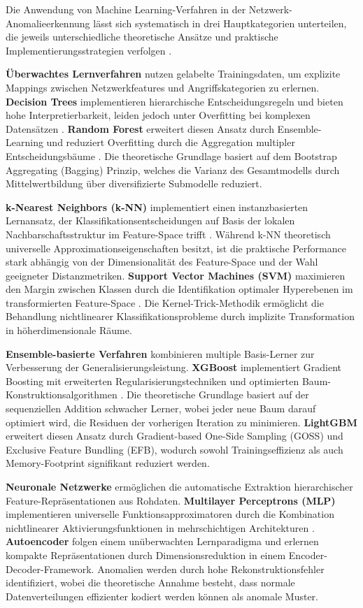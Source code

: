 \documentclass[11pt,a4paper]{article}
\begin{document}
    Die Anwendung von Machine Learning-Verfahren in der Netzwerk-Anomalieerkennung lässt sich systematisch in drei Hauptkategorien unterteilen, die jeweils unterschiedliche theoretische Ansätze und praktische Implementierungsstrategien verfolgen \parencite{Vinayakumar2019}.

    \textbf{Überwachtes Lernverfahren} nutzen gelabelte Trainingsdaten, um explizite Mappings zwischen Netzwerkfeatures und Angriffskategorien zu erlernen. \textbf{Decision Trees} implementieren hierarchische Entscheidungsregeln und bieten hohe Interpretierbarkeit, leiden jedoch unter Overfitting bei komplexen Datensätzen \parencite{Hastie2009}. \textbf{Random Forest} erweitert diesen Ansatz durch Ensemble-Learning und reduziert Overfitting durch die Aggregation multipler Entscheidungsbäume \parencite{Hastie2009}. Die theoretische Grundlage basiert auf dem Bootstrap Aggregating (Bagging) Prinzip, welches die Varianz des Gesamtmodells durch Mittelwertbildung über diversifizierte Submodelle reduziert.

    \textbf{k-Nearest Neighbors (k-NN)} implementiert einen instanzbasierten Lernansatz, der Klassifikationsentscheidungen auf Basis der lokalen Nachbarschaftsstruktur im Feature-Space trifft \parencite{Bishop2006}. Während k-NN theoretisch universelle Approximationseigenschaften besitzt, ist die praktische Performance stark abhängig von der Dimensionalität des Feature-Space und der Wahl geeigneter Distanzmetriken. \textbf{Support Vector Machines (SVM)} maximieren den Margin zwischen Klassen durch die Identifikation optimaler Hyperebenen im transformierten Feature-Space \parencite{Platt1999}. Die Kernel-Trick-Methodik ermöglicht die Behandlung nichtlinearer Klassifikationsprobleme durch implizite Transformation in höherdimensionale Räume.

    \textbf{Ensemble-basierte Verfahren} kombinieren multiple Basis-Lerner zur Verbesserung der Generalisierungsleistung. \textbf{XGBoost} implementiert Gradient Boosting mit erweiterten Regularisierungstechniken und optimierten Baum-Konstruktionsalgorithmen \parencite{Hastie2009}. Die theoretische Grundlage basiert auf der sequenziellen Addition schwacher Lerner, wobei jeder neue Baum darauf optimiert wird, die Residuen der vorherigen Iteration zu minimieren. \textbf{LightGBM} erweitert diesen Ansatz durch Gradient-based One-Side Sampling (GOSS) und Exclusive Feature Bundling (EFB), wodurch sowohl Trainingseffizienz als auch Memory-Footprint signifikant reduziert werden.

    \textbf{Neuronale Netzwerke} ermöglichen die automatische Extraktion hierarchischer Feature-Repräsentationen aus Rohdaten. \textbf{Multilayer Perceptrons (MLP)} implementieren universelle Funktionsapproximatoren durch die Kombination nichtlinearer Aktivierungsfunktionen in mehrschichtigen Architekturen \parencite{Goodfellow2016}. \textbf{Autoencoder} folgen einem unüberwachten Lernparadigma und erlernen kompakte Repräsentationen durch Dimensionsreduktion in einem Encoder-Decoder-Framework. Anomalien werden durch hohe Rekonstruktionsfehler identifiziert, wobei die theoretische Annahme besteht, dass normale Datenverteilungen effizienter kodiert werden können als anomale Muster.
\end{document}
